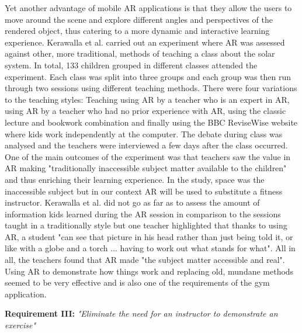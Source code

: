 \documentclass{l4proj}
\begin{document}
Yet another advantage of mobile AR applications is that they allow the users to move around the scene and explore different angles and perspectives of the rendered object, thus catering to a more dynamic and interactive learning experience\cite{fitzgerald_augmented_2013}\cite{dede_immersive_2009}. Kerawalla et al. carried out an experiment where AR was assessed against other, more traditional, methods of teaching a class about the solar system\cite{kerawalla_making_2006}. In total, 133 children grouped in different classes attended the experiment. Each class was split into three groups and each group was then run through two sessions using different teaching methods. There were four variations to the teaching styles: Teaching using AR by a teacher who is an expert in AR, using AR by a teacher who had no prior experience with AR, using the classic lecture and bookwork combination and finally using the BBC ReviseWise website where kids work independently at the computer. The debate during class was analysed and the teachers were interviewed a few days after the class occurred. One of the main outcomes of the experiment was that teachers saw the value in AR making "traditionally inaccessible subject matter available to the children"\cite{kerawalla_making_2006} and thus enriching their learning experience. In the study, space was the inaccessible subject but in our context AR will be used to substitute a fitness instructor. Kerawalla et al. did not go as far as to assess the amount of information kids learned during the AR session in comparison to the sessions taught in a traditionally style but one teacher highlighted that thanks to using AR, a student "can see that picture in his head rather than just being told it, or like with a globe and a torch ... having to work out what stands for what"\cite{kerawalla_making_2006}. All in all, the teachers found that AR made "the  subject  matter  accessible  and real". Using AR to demonstrate how things work and replacing old, mundane methods seemed to be very effective and is also one of the requirements of the gym application.  

\textbf{Requirement III:} \textit{"Eliminate the need for an instructor to demonstrate an exercise"}  \label{requirement_III}
\end{document}
